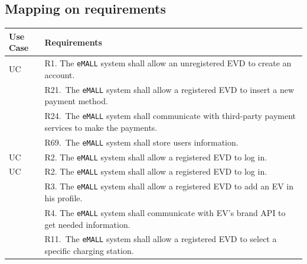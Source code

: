 \subsection{Mapping on requirements}
\label{subsec: map_on_req}%
\setcounter{mr}{1}
\newcommand{\cmr}{\themr\stepcounter{mr}}
\begin{center}
    \begin{longtable}{p{0.12\linewidth}p{0.88\linewidth}}
        \hline
        \textbf{Use Case} & \textbf{Requirements}                                                                                                                           \\
        \hline
        UC\cmr            & R1. The \verb|eMALL| system shall allow an unregistered EVD to create an account.                                                                      \\
        & R21.\ The \verb|eMALL| system shall allow a registered EVD to insert a new payment method.                                                             \\
        & R24.\ The \verb|eMALL| system shall communicate with third-party payment services to make the payments.                                                \\
        & R69.\ The \verb|eMALL| system shall store users information.                                                                                           \\
        \hline
        UC\cmr            & R2. The \verb|eMALL| system shall allow a registered EVD to log in.                                                                                    \\
        \hline
        UC\cmr            & R2. The \verb|eMALL| system shall allow a registered EVD to log in.                                                                                    \\
        & R3. The \verb|eMALL| system shall allow a registered EVD to add an EV in his profile.                                                                  \\
        & R4. The \verb|eMALL| system shall communicate with EV’s brand API to get needed information.                                                           \\
        & R11.\ The \verb|eMALL| system shall allow a registered EVD to select a specific charging station.                                                      \\

\end{longtable}
\end{center}
